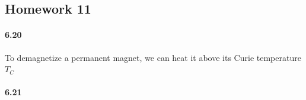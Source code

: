 \documentclass[../main.tex]{subfiles}
\begin{document}
\pagestyle{fancy}

\begin{center}
    \section*{Homework 11}
\end{center}

\paragraph{6.20} To demagnetize a permanent magnet, we can heat it above its Curie temperature $T_C$

\paragraph{6.21} 
\end{document}
